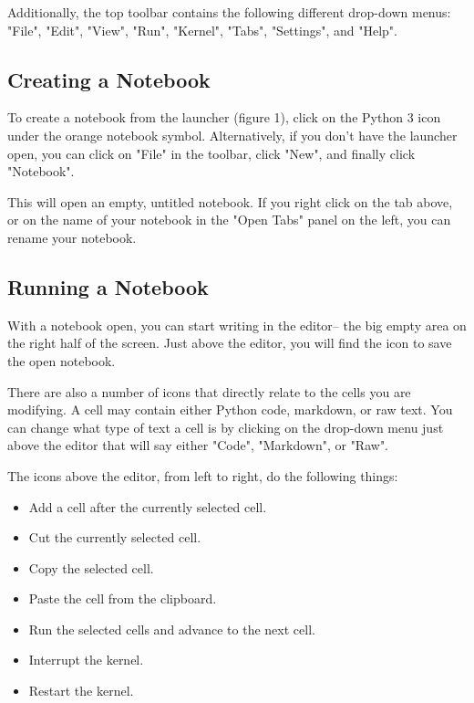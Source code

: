 \documentclass[pdftex,12pt]{artikel3}
\begin{document}
Additionally, the top toolbar contains the following different drop-down menus: "File", "Edit", "View", "Run", "Kernel", "Tabs", "Settings", and "Help".

\subsection{Creating a Notebook}

To create a notebook from the launcher (figure 1), click on the Python 3 icon under the orange notebook symbol. Alternatively, if you don't have the launcher open, you can click on "File" in the toolbar, click "New", and finally click "Notebook".

This will open an empty, untitled notebook. If you right click on the tab above, or on the name of your notebook in the "Open Tabs" panel on the left, you can rename your notebook.

\subsection{Running a Notebook}

With a notebook open, you can start writing in the editor-- the big empty area on the right half of the screen. Just above the editor, you will find the icon to save the open notebook.

There are also a number of icons that directly relate to the cells you are modifying. A cell may contain either Python code, markdown, or raw text. You can change what type of text a cell is by clicking on the drop-down menu just above the editor that will say either "Code", "Markdown", or "Raw".

The icons above the editor, from left to right, do the following things: 

\begin{itemize}
    \item Add a cell after the currently selected cell.
    \item Cut the currently selected cell.
    \item Copy the selected cell.
    \item Paste the cell from the clipboard.
    \item Run the selected cells and advance to the next cell.
    \item Interrupt the kernel.
    \item Restart the kernel.
\end{itemize}
\end{document}
